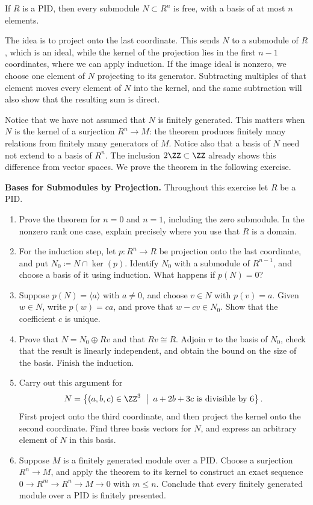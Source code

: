 \documentclass[12pt,reqno]{amsart}
\begin{document}
\begin{theorem}
If $R$ is a PID, then every submodule $N\subset R^n$ is free, with a basis of at most $n$ elements.
\end{theorem}

The idea is to project onto the last coordinate. This sends $N$ to a submodule of $R$, which is an ideal, while the kernel of the projection lies in the first $n-1$ coordinates, where we can apply induction. If the image ideal is nonzero, we choose one element of $N$ projecting to its generator. Subtracting multiples of that element moves every element of $N$ into the kernel, and the same subtraction will also show that the resulting sum is direct.

Notice that we have not assumed that $N$ is finitely generated. This matters when $N$ is the kernel of a surjection $R^n\to M$: the theorem produces finitely many relations from finitely many generators of $M$. Notice also that a basis of $N$ need not extend to a basis of $R^n$. The inclusion $2\ZZ\subset\ZZ$ already shows this difference from vector spaces. We prove the theorem in the following exercise.

\hrulefill

\begin{problems}
\item\label{s:submodules} \textbf{Bases for Submodules by Projection.} Throughout this exercise let $R$ be a PID.
\begin{enumerate}
\item Prove the theorem for $n=0$ and $n=1$, including the zero submodule. In the nonzero rank one case, explain precisely where you use that $R$ is a domain.
\item For the induction step, let $p:R^n\to R$ be projection onto the last coordinate, and put $N_0\coloneqq N\cap\ker(p)$. Identify $N_0$ with a submodule of $R^{n-1}$, and choose a basis of it using induction. What happens if $p(N)=0$?
\item Suppose $p(N)=\langle a\rangle$ with $a\ne0$, and choose $v\in N$ with $p(v)=a$. Given $w\in N$, write $p(w)=ca$, and prove that $w-cv\in N_0$. Show that the coefficient $c$ is unique.
\item Prove that $N=N_0\oplus Rv$ and that $Rv\cong R$. Adjoin $v$ to the basis of $N_0$, check that the result is linearly independent, and obtain the bound on the size of the basis. Finish the induction.
\item Carry out this argument for
\[
N=\left\{(a,b,c)\in\ZZ^3 \;\; \big| \;\; a+2b+3c\text{ is divisible by }6\right\}.
\]
First project onto the third coordinate, and then project the kernel onto the second coordinate. Find three basis vectors for $N$, and express an arbitrary element of $N$ in this basis.
\item Suppose $M$ is a finitely generated module over a PID. Choose a surjection $R^n\to M$, and apply the theorem to its kernel to construct an exact sequence $0\to R^m\to R^n\to M\to0$ with $m\leq n$. Conclude that every finitely generated module over a PID is finitely presented.
\end{enumerate}
\end{problems}
\end{document}
